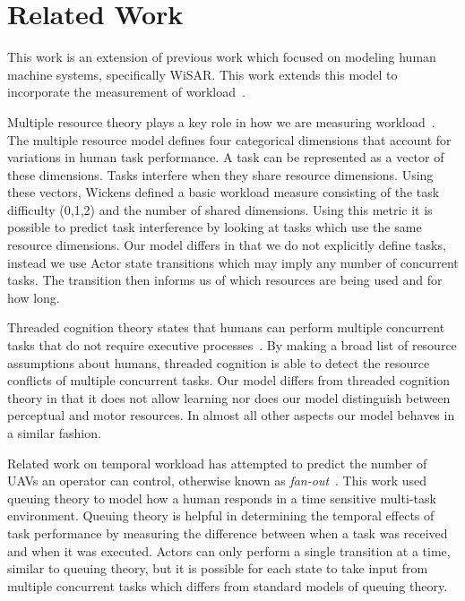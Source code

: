 \section{Related Work}

This work is an extension of previous work which focused on modeling human
machine systems, specifically WiSAR.  This work extends this model to
incorporate the measurement of workload~\cite{gledhill2013modelinguas}.

Multiple resource theory plays a key role in how we are measuring workload~\cite{wickens2002multiple}. The multiple resource model defines four categorical dimensions that
account for variations in human task performance.  A task can be represented as a vector of these dimensions.  Tasks interfere when they share resource dimensions.  Using these vectors, Wickens defined a basic workload measure consisting of the task difficulty (0,1,2) and the number of shared dimensions.  Using this metric it is possible to predict task interference by looking at tasks which use the same resource dimensions.  Our model differs in that we do not explicitly define tasks, instead we use Actor state transitions which may imply any number of concurrent tasks.  The transition then informs us of which resources are being used and for how long.  

Threaded cognition theory states that humans can perform
multiple concurrent tasks that do not require executive processes~\cite{salvucci2008threaded}.  By making a
broad list of resource assumptions about humans, threaded cognition is able to
detect the resource conflicts of multiple concurrent tasks.  Our model differs from
threaded cognition theory in that it does not allow learning nor does our model distinguish
between perceptual and motor resources. In almost all other aspects our model behaves in a similar fashion.

Related work on temporal workload has attempted to predict the number of UAVs an operator can
control, otherwise known as {\em fan-out}~\cite{cummings2007predicting,OlsenWood2004,CrandallEtAl2005}.  This work used queuing theory
to model how a human responds in a time sensitive multi-task environment.  Queuing theory is helpful in determining the temporal effects of task performance by measuring the difference between when a task was received and when it was executed.  Actors can only perform a single transition at a time, similar to queuing theory, but it is possible for each state to take input from multiple concurrent tasks which differs from standard models of queuing theory.

